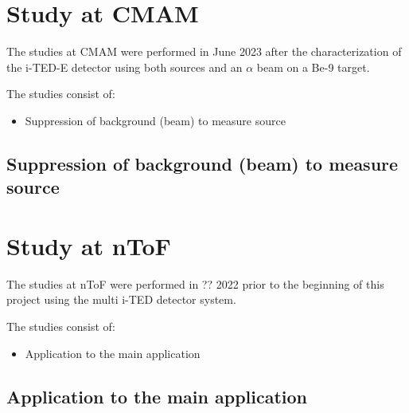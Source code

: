 \section{Study at CMAM}

The studies at \ac{CMAM} were performed in June 2023 after the characterization of the \ac{i-TED}-E detector using both sources and an $\alpha$ beam on a Be-9 target.

The studies consist of:
\begin{itemize}
    \item Suppression of background (beam) to measure source
\end{itemize}

\subsection{Suppression of background (beam) to measure source}

\section{Study at nToF}

The studies at \ac{nToF} were performed in ?? 2022 prior to the beginning of this project using the multi \ac{i-TED} detector system.

The studies consist of:
\begin{itemize}
    \item Application to the main application
\end{itemize}

\subsection{Application to the main application}

